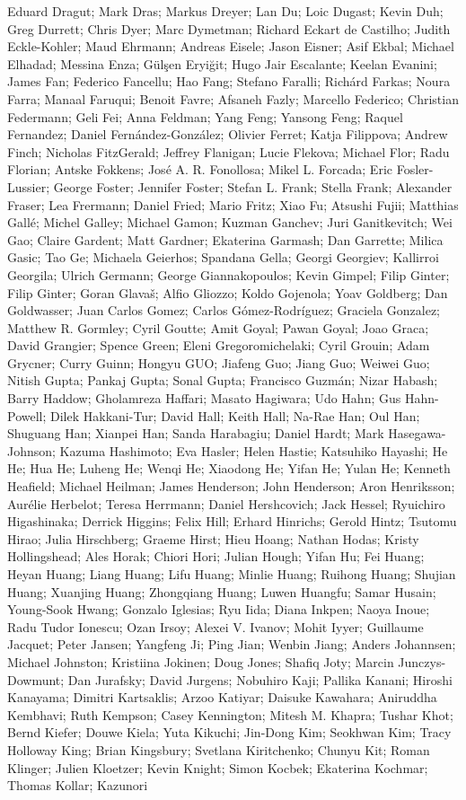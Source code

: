 \documentclass[11pt]{article}
\begin{document}
Eduard Dragut; Mark Dras; Markus Dreyer; Lan Du; Loic Dugast; Kevin Duh; Greg Durrett; Chris Dyer; Marc Dymetman; Richard Eckart de Castilho; Judith Eckle-Kohler; Maud Ehrmann; Andreas Eisele; Jason Eisner; Asif Ekbal; Michael Elhadad; Messina Enza; Gülşen Eryiğit; Hugo Jair Escalante; Keelan Evanini; James Fan; Federico Fancellu; Hao Fang; Stefano Faralli; Richárd Farkas; Noura Farra; Manaal Faruqui; Benoit Favre; Afsaneh Fazly; Marcello Federico; Christian Federmann; Geli Fei; Anna Feldman; Yang Feng; Yansong Feng; Raquel Fernandez; Daniel Fernández-González; Olivier Ferret; Katja Filippova; Andrew Finch; Nicholas FitzGerald; Jeffrey Flanigan; Lucie Flekova; Michael Flor; Radu Florian; Antske Fokkens; José A. R. Fonollosa; Mikel L. Forcada; Eric Fosler-Lussier; George Foster; Jennifer Foster; Stefan L. Frank; Stella Frank; Alexander Fraser; Lea Frermann; Daniel Fried; Mario Fritz; Xiao Fu; Atsushi Fujii; Matthias Gallé; Michel Galley; Michael Gamon; Kuzman Ganchev; Juri Ganitkevitch; Wei Gao; Claire Gardent; Matt Gardner; Ekaterina Garmash; Dan Garrette; Milica Gasic; Tao Ge; Michaela Geierhos; Spandana Gella; Georgi Georgiev; Kallirroi Georgila; Ulrich Germann; George Giannakopoulos; Kevin Gimpel; Filip Ginter; Filip Ginter; Goran Glavaš; Alfio Gliozzo; Koldo Gojenola; Yoav Goldberg; Dan Goldwasser; Juan Carlos Gomez; Carlos Gómez-Rodríguez; Graciela Gonzalez; Matthew R. Gormley; Cyril Goutte; Amit Goyal; Pawan Goyal; Joao Graca; David Grangier; Spence Green; Eleni Gregoromichelaki; Cyril Grouin; Adam Grycner; Curry Guinn; Hongyu GUO; Jiafeng Guo; Jiang Guo; Weiwei Guo; Nitish Gupta; Pankaj Gupta; Sonal Gupta; Francisco Guzmán; Nizar Habash; Barry Haddow; Gholamreza Haffari; Masato Hagiwara; Udo Hahn; Gus Hahn-Powell; Dilek Hakkani-Tur; David Hall; Keith Hall; Na-Rae Han; Oul Han; Shuguang Han; Xianpei Han; Sanda Harabagiu; Daniel Hardt; Mark Hasegawa-Johnson; Kazuma Hashimoto; Eva Hasler; Helen Hastie; Katsuhiko Hayashi; He He; Hua He; Luheng He; Wenqi He; Xiaodong He; Yifan He; Yulan He; Kenneth Heafield; Michael Heilman; James Henderson; John Henderson; Aron Henriksson; Aurélie Herbelot; Teresa Herrmann; Daniel Hershcovich; Jack Hessel; Ryuichiro Higashinaka; Derrick Higgins; Felix Hill; Erhard Hinrichs; Gerold Hintz; Tsutomu Hirao; Julia Hirschberg; Graeme Hirst; Hieu Hoang; Nathan Hodas; Kristy Hollingshead; Ales Horak; Chiori Hori; Julian Hough; Yifan Hu; Fei Huang; Heyan Huang; Liang Huang; Lifu Huang; Minlie Huang; Ruihong Huang; Shujian Huang; Xuanjing Huang; Zhongqiang Huang; Luwen Huangfu; Samar Husain; Young-Sook Hwang; Gonzalo Iglesias; Ryu Iida; Diana Inkpen; Naoya Inoue; Radu Tudor Ionescu; Ozan Irsoy; Alexei V. Ivanov; Mohit Iyyer; Guillaume Jacquet; Peter Jansen; Yangfeng Ji; Ping Jian; Wenbin Jiang; Anders Johannsen; Michael Johnston; Kristiina Jokinen; Doug Jones; Shafiq Joty; Marcin Junczys-Dowmunt; Dan Jurafsky; David Jurgens; Nobuhiro Kaji; Pallika Kanani; Hiroshi Kanayama; Dimitri Kartsaklis; Arzoo Katiyar; Daisuke Kawahara; Aniruddha Kembhavi; Ruth Kempson; Casey Kennington; Mitesh M. Khapra; Tushar Khot; Bernd Kiefer; Douwe Kiela; Yuta Kikuchi; Jin-Dong Kim; Seokhwan Kim; Tracy Holloway King; Brian Kingsbury; Svetlana Kiritchenko; Chunyu Kit; Roman Klinger; Julien Kloetzer; Kevin Knight; Simon Kocbek; Ekaterina Kochmar; Thomas Kollar; Kazunori 
\end{document}
